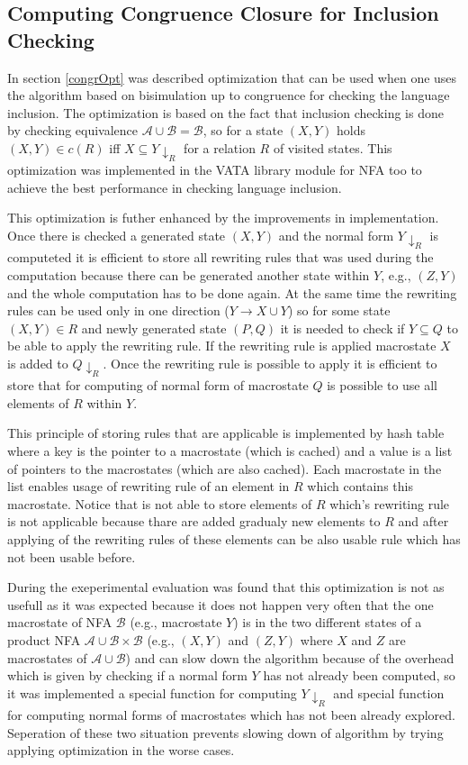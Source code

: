 \subsection{Computing Congruence Closure for Inclusion Checking}
In section \ref{congrOpt} was described optimization that can be used when one uses the algorithm based on bisimulation up to congruence for checking 
the language inclusion. The optimization is based on the fact that inclusion checking is done by checking equivalence $\mathcal{A}\cup\mathcal{B}=\mathcal{B}$,
so for a state $(X,Y)$ holds $(X,Y)\in c(R)$ iff $X\subseteq Y{\downarrow_R}$ for a relation $R$ of visited states. 
This optimization was implemented in the VATA library module for NFA too to achieve the best performance in checking language inclusion.

This optimization is futher enhanced by the improvements in implementation. Once there is checked a generated state $(X,Y)$ and the normal form 
$Y{\downarrow_R}$ is computeted it is efficient to store all rewriting rules that was used during the computation because there can be
generated another state within $Y$, e.g., $(Z,Y)$ and the whole computation has to be done again. At the same time the rewriting rules can be used only in one
direction ($Y\rightarrow X\cup Y$) so for some state $(X,Y)\in R$ and newly generated state $(P,Q)$ it is needed to check if $Y \subseteq Q$ to be able to apply
the rewriting rule. If the rewriting rule is applied macrostate $X$ is added to $Q{\downarrow_R}$. Once the rewriting rule is possible to apply it is 
efficient to store that for computing of normal form of macrostate $Q$ is possible to use all elements of $R$ within $Y$.

This principle of storing rules that are applicable is implemented by hash table where a key is the pointer to a macrostate (which is cached)
and a value is a list of pointers to the macrostates (which are also cached). Each macrostate in the list enables usage of rewriting rule of an element in $R$ 
which contains this macrostate. Notice that is not able to store elements of $R$ which's rewriting rule is not applicable because thare are added gradualy
new elements to $R$ and after applying of the rewriting rules of these elements can be also usable rule which has not been usable before.%

During the exeperimental evaluation was found that this optimization is not as usefull as it was expected because it does not happen very often that the one
macrostate of NFA $\mathcal{B}$ (e.g., macrostate $Y$) is in the two different states of a product NFA $\mathcal{A}\cup\mathcal{B}\times\mathcal{B}$ (e.g., $(X,Y)$
and $(Z,Y)$ where $X$ and $Z$ are macrostates of $\mathcal{A}\cup\mathcal{B}$) and can slow down the algorithm because of the overhead which is given by checking
if a normal form $Y$ has not already been computed, so it was implemented a special function for computing $Y{\downarrow_R}$ and special function for computing
normal forms of macrostates which has not been already explored. Seperation of these two situation prevents slowing down of algorithm by trying applying
optimization in the worse cases.

